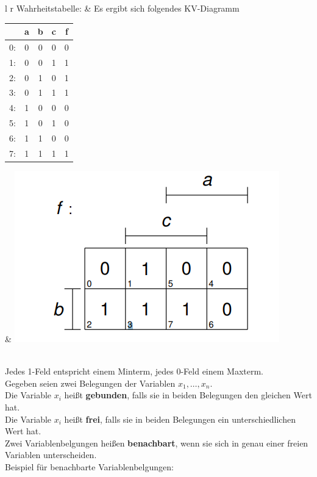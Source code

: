 \documentclass[12pt]{article}
\begin{document}
\begin{tabular}{l r}
    Wahrheitstabelle: & Es ergibt sich folgendes KV-Diagramm \\
    \begin{tabular}{c|c c c|c}
        & a & b & c & f \\ \hline
        0: & 0 & 0 & 0 & 0 \\
        1: & 0 & 0 & 1 & 1 \\
        2: & 0 & 1 & 0 & 1 \\
        3: & 0 & 1 & 1 & 1 \\
        4: & 1 & 0 & 0 & 0 \\
        5: & 1 & 0 & 1 & 0 \\
        6: & 1 & 1 & 0 & 0 \\
        7: & 1 & 1 & 1 & 1
    \end{tabular} & \includegraphics[scale=0.55]{image3.png} \\
\end{tabular} \\
\newline
Jedes 1-Feld entspricht einem Minterm, jedes 0-Feld einem Maxterm. \\
\newline
Gegeben seien zwei Belegungen der Variablen $x_1, \dots, x_n$. \\
Die Variable $x_i$ heißt \textbf{gebunden}, falls sie in beiden Belegungen den gleichen Wert hat. \\
Die Variable $x_i$ heißt \textbf{frei}, falls sie in beiden Belegungen ein unterschiedlichen Wert hat. \\
Zwei Variablenbelgungen heißen \textbf{benachbart}, wenn sie sich in genau einer freien Variablen unterscheiden. \\
\newline
Beispiel für benachbarte Variablenbelgungen: \\
\end{document}
